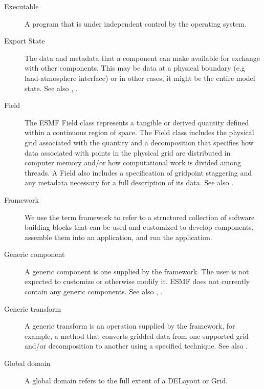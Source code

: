\begin{description}
\label{glos:Exec} 
\item[Executable] 
  A program that is under independent control by the operating 
  system.

\label{glos:ExportState} 
\item[Export State] 
  The data and metadata that 
  a component can make available for exchange with other components. 
  This may be data at a physical boundary (e.g land-atmosphere interface) 
  or in other cases, it might be the entire model state.  
  See also , .

\label{glos:Field} 
\item[Field] The ESMF Field class represents a tangible or derived quantity
defined within a continuous region of space.  The Field class includes
the physical grid associated with the quantity and a decomposition
that specifies how data associated with points in the 
physical grid are distributed in computer memory and/or how computational 
work is divided among threads.  A Field also includes a specification 
of gridpoint staggering and any metadata necessary for a full description
of its data.  See also .

\label{glos:Framework} 
\item[Framework] We use the term framework to 
  refer to a structured collection of software building blocks that can be used 
  and customized to develop components, assemble them into an application, and 
  run the application.

\label{glos:GenericComp} 
\item[Generic component] A generic component
  is one supplied by the framework.  The user is not expected to 
  customize or otherwise modify it.  ESMF does not currently contain any
  generic components.  See also , 
  . 

\label{glos:GenericTrans} 
\item[Generic transform] A generic transform 
  is an operation supplied by the framework, for example, a method 
  that converts gridded data from one supported grid and/or 
  decomposition to another using a specified technique.  See also .

\label{glos:GlobDomain}
\item[Global domain] 
  A global domain refers to the full extent of a DELayout or Grid.


\end{description}
